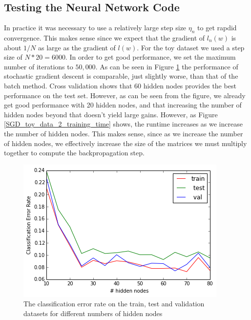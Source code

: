 \documentclass[10pt]{article}
\begin{document}
\subsection*{Testing the Neural Network Code}



In practice it was necessary to use a relatively large step size $\eta_n$ to get rapdid convergence. This makes sense since we expect that the gradient of $l_n(w)$ is about $1/N$ as large as the gradient of $l(w)$. For the toy dataset we used a step size of $N*20 = 6000$. In order to get good performance, we set the maximum number of iterations to $50,000$. As can be seen in Figure \ref{SGD_toy_data_2_CER} the performance of stochastic gradient descent is comparable, just slightly worse, than that of the batch method. Cross validation shows that 60 hidden nodes provides the best performance on the test set. However, as can be seen from the figure, we already get good performance with 20 hidden nodes, and that increasing the number of hidden nodes beyond that doesn't yield large gains. However, as Figure \ref{SGD_toy_data_2_training_time} shows, the runtime increases as we increase the number of hidden nodes. This makes sense, since as we increase the number of hidden nodes, we effectively increase the size of the matrices we must multiply together to compute the backpropagation step.

\begin{figure}
\centering
\includegraphics[scale=0.5]{SGD_toy_data_2_CER.png}
\caption{The classification error rate on the train, test and validation datasets for different numbers of hidden nodes}
\label{SGD_toy_data_2_CER}
\end{figure}
\end{document}

